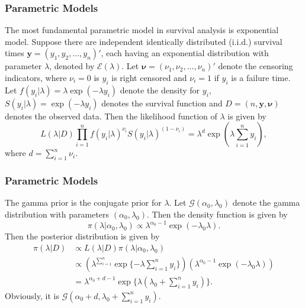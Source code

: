 \documentclass{beamer}
\begin{document}
	\begin{frame}
		\frametitle{Parametric Models}
		The most fundamental parametric model in survival analysis is exponential model. Suppose there are independent identically distributed  (i.i.d.) survival times $\boldsymbol{y} = (y_1, y_2, \dots, y_n)'$, each having an exponential distribution with parameter $\lambda$, denoted by $\mathcal{E}(\lambda)$. Let $\boldsymbol{\nu} = (\nu_1, \nu_2, \dots, \nu_n)'$ denote the censoring indicators, where $\nu_i = 0$ is $y_i$ is right censored and $\nu_i = 1$ if $y_i$ is a failure time. Let $f(y_i | \lambda) = \lambda\exp(-\lambda y_i)$ denote the density for $y_i$, $S(y_i | \lambda) = \exp(-\lambda y_i)$ denotes the survival function and $D = (n, \boldsymbol{y}, \boldsymbol{\nu})$ denotes the observed data. Then the likelihood function of $\lambda$ is given by
		\[
		L(\lambda | D) \prod_{i = 1}^{n} f(y_i | \lambda) ^ { \nu_i} S(y_i | \lambda) ^ {(1 - \nu_i)} = \lambda ^ d \exp(\lambda\sum_{i = 1}^{n}y_i),
		\]
		where $d = \sum_{i = 1}^{n}\nu_i$.
	\end{frame}
	
	\begin{frame}
		\frametitle{Parametric Models}
		The gamma prior is the conjugate prior for $\lambda$. Let $\mathcal{G}(\alpha_0, \lambda_0)$ denote the gamma distribution with parameters $(\alpha_0, \lambda_0)$. Then the density function is given by
		\[
		\pi(\lambda | \alpha_0, \lambda_0) \propto \lambda ^ {\alpha_0 - 1} \exp(-\lambda_0\lambda).
		\]
		Then the posterior distribution is given by
		\begin{align*}
			\pi(\lambda | D) & \propto L(\lambda | D) \pi(\lambda | \alpha_0, \lambda_0) \\
			& \propto ( \lambda ^ {\sum_{i = 1}^{n}}\exp\{-\lambda\sum_{i = 1}^{n}y_i\})(\lambda ^ {\alpha_0 - 1}\exp( -\lambda_0\lambda)) \\
			& = \lambda ^ {\alpha_0 + d - 1}\exp\{\lambda( \lambda_0 + \sum_{i = 1}^{n}y_i)\}.
		\end{align*}
	    Obviously, it is $\mathcal{G}(\alpha_0 + d, \lambda_0 + \sum_{i = 1}^{n}y_i)$.
	\end{frame}
	
\end{document}
